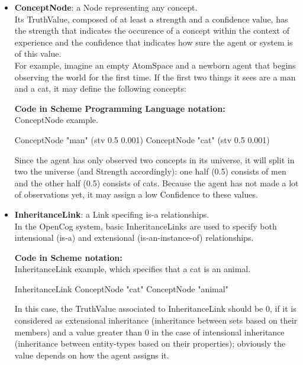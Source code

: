 \begin{itemize}
	\item \textbf{ConceptNode}: a Node representing any concept. \\
Its TruthValue, composed of at least a strength and a confidence value, has the strength that indicates the occurence of a concept within the context of experience and the confidence that indicates how sure the agent or system is of this value. 
\\
For example, imagine an empty AtomSpace and a newborn agent that begins observing the world for the first time. If the first two things it sees are a man and a cat, it may define the following concepts:

\begin{footnotesize}\textbf{Code in Scheme Programming Language notation:} \\
ConceptNode example.\end{footnotesize}
\begin{python}
	ConceptNode "man" (stv 0.5 0.001)
	ConceptNode "cat" (stv 0.5 0.001)
\end{python}

Since the agent has only observed two concepts in its universe, it will split in two the universe (and Strength accordingly): one half (0.5) consists of men and the other half (0.5) consists of cats.
Because the agent has not made a lot of observations yet, it may assign a low Confidence to these values.

	\item \textbf{InheritanceLink}: a Link specifing is-a relationships. \\
In the OpenCog system, basic InheritanceLinks are used to specify both intensional (is-a) and extensional (is-an-instance-of) relationships.

\begin{footnotesize}\textbf{Code in Scheme notation:} \\
InheritanceLink example, which specifies that a cat is an animal.
\end{footnotesize}
\begin{python}
	InheritanceLink
		ConceptNode "cat"
		ConceptNode "animal"
\end{python}

In this case, the TruthValue associated to InheritanceLink should be 0, if it is considered as extensional inheritance (inheritance between sets based on their members) and a value greater than 0 in the case of intensional inheritance (inheritance between entity-types based on their properties); obviously the value depends on how the agent assigns it.


\end{itemize}
